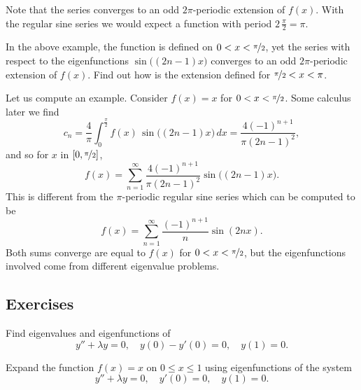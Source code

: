 \begin{example}
Note that the series converges to an odd $2\pi$-periodic
extension of $f(x)$.  With the regular sine series we would expect
a function with period $2 \, \frac{\pi}{2} = \pi$.

\begin{exercise}[challenging]
In the above example, the function is defined on $0 < x < \nicefrac{\pi}{2}$,
yet the series with respect to the eigenfunctions
$\sin \bigl( (2n-1)x \bigr)$ converges to an odd $2\pi$-periodic extension of $f(x)$.
Find out how is the extension defined for $\nicefrac{\pi}{2} < x < \pi$.
\end{exercise}

Let us compute an example.
Consider $f(x) = x$ for $0 < x <  \nicefrac{\pi}{2}$.  Some
calculus later we find
\begin{equation*}
c_n = 
\frac{4}{\pi} \int_0^{\frac{\pi}{2}} f(x) \,\sin \bigl( (2n-1)x \bigr) \, dx 
=
\frac{4{(-1)}^{n+1}}{\pi {(2n-1)}^2} ,
\end{equation*}
and so for $x$ in $[0,\nicefrac{\pi}{2}]$,
\begin{equation*}
f(x) = \sum_{n=1}^\infty \frac{4{(-1)}^{n+1}}{\pi {(2n-1)}^2}
\sin \bigl( (2n-1)x \bigr) .
\end{equation*}
This is different from the $\pi$-periodic regular sine series which can
be computed to be
\begin{equation*}
f(x) = \sum_{n=1}^\infty \frac{{(-1)}^{n+1}}{n}  \sin ( 2nx ) .
\end{equation*}
Both sums converge are equal to $f(x)$ for $0 < x < \nicefrac{\pi}{2}$, but
the eigenfunctions involved come from different eigenvalue problems.
\end{example}

\subsection{Exercises}

\begin{exercise}
Find eigenvalues and eigenfunctions of
\begin{equation*}
y''+\lambda y = 0, \quad y(0)- y'(0) = 0, \quad y(1) = 0 .
\end{equation*}
\end{exercise}

\begin{exercise}
Expand the function $f(x) = x$ on $0 \leq x \leq 1$ using eigenfunctions
of the system
\begin{equation*}
y'' + \lambda y = 0, \quad y'(0) = 0, \quad y(1) = 0 .
\end{equation*}
\end{exercise}

